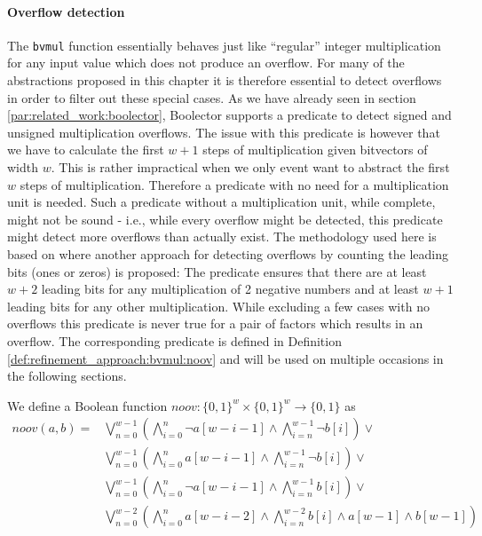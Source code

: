 \paragraph{Overflow detection}
The \texttt{bvmul} function essentially behaves just like \enquote{regular} integer multiplication for any input value
which does not produce an overflow.
For many of the abstractions proposed in this chapter it is therefore essential to detect overflows in order to filter out these special cases.
As we have already seen in section \ref{par:related_work:boolector}, Boolector supports a predicate to detect signed and unsigned multiplication overflows.
The issue with this predicate is however that we have to calculate the first $w+1$ steps of multiplication given bitvectors of width $w$.
This is rather impractical when we only event  want to abstract the first $w$ steps of multiplication.
Therefore a predicate with no need for a multiplication unit is needed.
Such a predicate without a multiplication unit, while complete, might not be sound - i.e., while every overflow might be detected,
this predicate might detect more overflows than actually exist.
The methodology used here is based on \cite{Warren-HackersDelight} where another approach for detecting overflows by counting the leading bits (ones or zeros)
is proposed:
The predicate ensures that there are at least $w+2$ leading bits for any multiplication of 2 negative numbers and at least $w+1$ leading bits for any other multiplication.
While excluding a few cases with no overflows this predicate is never true for a pair of factors which results in an overflow.
The corresponding predicate is defined in Definition \ref{def:refinement_approach:bvmul:noov} and will be used on multiple occasions in the following sections.
\begin{definition}
    We define a Boolean function $noov: \{0,1\}^w \times \{0,1\}^w \rightarrow \{0,1\}$ as
    \label{def:refinement_approach:bvmul:noov}
    \begin{align*}
        noov\left(a, b\right)
        = &\bigvee\limits_{n=0}^{w-1}
            \left(
            \bigwedge\limits_{i=0}^{n} \neg a[w-i-1]
            \land
            \bigwedge\limits_{i=n}^{w-1} \neg b[i]
            \right) \lor\\
            &\bigvee\limits_{n=0}^{w-1}
            \left(
            \bigwedge\limits_{i=0}^{n} a[w-i-1]
            \land
            \bigwedge\limits_{i=n}^{w-1} \neg b[i]
            \right) \lor\\
            &\bigvee\limits_{n=0}^{w-1}
            \left(
            \bigwedge\limits_{i=0}^{n} \neg a[w-i-1]
            \land
            \bigwedge\limits_{i=n}^{w-1} b[i]
            \right) \lor\\
            &\bigvee\limits_{n=0}^{w-2}
            \left(
            \bigwedge\limits_{i=0}^{n} a[w-i-2]
            \land
            \bigwedge\limits_{i=n}^{w-2} b[i]
            \land a[w-1]
            \land b[w-1]
            \right)
    \end{align*}
\end{definition}

